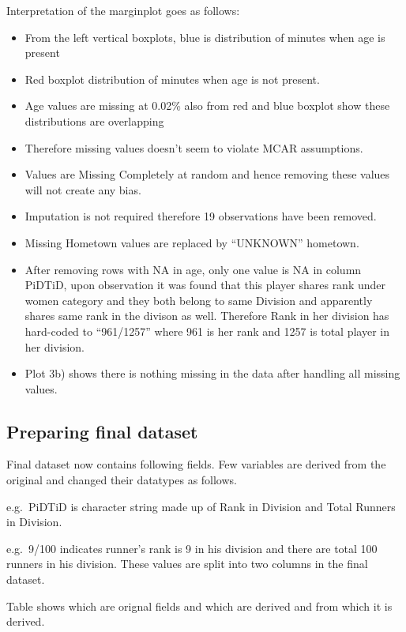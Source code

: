 \documentclass[
]{article}
\providecommand{\tightlist}{%
  \setlength{\itemsep}{0pt}\setlength{\parskip}{0pt}}
\begin{document}
Interpretation of the marginplot goes as follows:

\begin{itemize}
\tightlist
\item
  From the left vertical boxplots, blue is distribution of minutes when
  age is present
\item
  Red boxplot distribution of minutes when age is not present.
\item
  Age values are missing at 0.02\% also from red and blue boxplot show
  these distributions are overlapping
\item
  Therefore missing values doesn't seem to violate MCAR assumptions.
\item
  Values are Missing Completely at random and hence removing these
  values will not create any bias.
\item
  Imputation is not required therefore 19 observations have been
  removed.
\item
  Missing Hometown values are replaced by ``UNKNOWN'' hometown.
\item
  After removing rows with NA in age, only one value is NA in column
  PiDTiD, upon observation it was found that this player shares rank
  under women category and they both belong to same Division and
  apparently shares same rank in the divison as well. Therefore Rank in
  her division has hard-coded to ``961/1257'' where 961 is her rank and
  1257 is total player in her division.
\item
  Plot 3b) shows there is nothing missing in the data after handling all
  missing values.
\end{itemize}

\hypertarget{preparing-final-dataset}{%
\subsection{Preparing final dataset}\label{preparing-final-dataset}}

Final dataset now contains following fields. Few variables are derived
from the original and changed their datatypes as follows.

e.g.~PiDTiD is character string made up of Rank in Division and Total
Runners in Division.

e.g.~9/100 indicates runner's rank is 9 in his division and there are
total 100 runners in his division. These values are split into two
columns in the final dataset.

Table shows which are orignal fields and which are derived and from
which it is derived.
\end{document}
